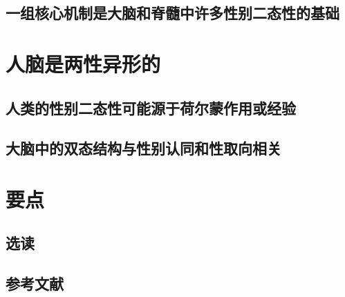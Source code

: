\subsection{一组核心机制是大脑和脊髓中许多性别二态性的基础}

\section{人脑是两性异形的}
\subsection{人类的性别二态性可能源于荷尔蒙作用或经验}
\subsection{大脑中的双态结构与性别认同和性取向相关}

\section{要点}
\subsection{选读}
\subsection{参考文献}
